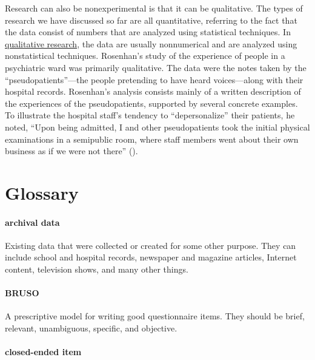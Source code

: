 \documentclass[
]{krantz}
\begin{document}
Research can also be nonexperimental is that it can be qualitative. The types of research we have discussed so far are all quantitative, referring to the fact that the data consist of numbers that are analyzed using statistical techniques. In \hyperref[qualitative-research]{qualitative research}, the data are usually nonnumerical and are analyzed using nonstatistical techniques. Rosenhan's study of the experience of people in a psychiatric ward was primarily qualitative. The data were the notes taken by the ``pseudopatients''---the people pretending to have heard voices---along with their hospital records. Rosenhan's analysis consists mainly of a written description of the experiences of the pseudopatients, supported by several concrete examples. To illustrate the hospital staff's tendency to ``depersonalize'' their patients, he noted, ``Upon being admitted, I and other pseudopatients took the initial physical examinations in a semipublic room, where staff members went about their own business as if we were not there'' ().

\section{Glossary}\label{glossary-7}

\paragraph*{archival data}\label{archival-data-1}

Existing data that were collected or created for some other purpose. They can include school and hospital records, newspaper and magazine articles, Internet content, television shows, and many other things.

\paragraph*{BRUSO}\label{bruso}

A prescriptive model for writing good questionnaire items. They should be brief, relevant, unambiguous, specific, and objective.

\paragraph*{closed-ended item}\label{closed-ended-item}
\end{document}
